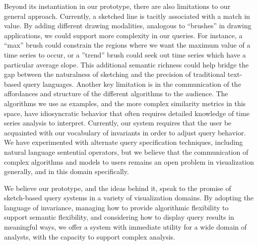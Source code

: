 Beyond its instantiation in our prototype, there are also limitations to our general approach. Currently, a sketched line is tacitly associated with a match in value. By adding different drawing modalities, analogous to ``brushes'' in drawing applications, we could support more complexity in our queries. For instance, a ``max'' brush could constrain the regions where we want the maximum value of a time series to occur, or a ''trend'' brush could seek out time series which have a particular average slope. This additional semantic richness could help bridge the gap between the naturalness of sketching and the precision of traditional text-based query languages. Another key limitation is in the communication of the affordances and structure of the different algorithms to the audience. The algorithms we use as examples, and the more complex similarity metrics in this space, have idiosyncratic behavior that often requires detailed knowledge of time series analysis to interpret. Currently, our system requires that the user be acquainted with our vocabulary of invariants in order to adjust query behavior. We have experimented with alternate query specification techniques, including natural language sentential operators, but we believe that the communication of complex algorithms and models to users remains an open problem in visualization generally, and in this domain specifically.

We believe our prototype, and the ideas behind it, speak to the promise of sketch-based query systems in a variety of visualization domains. By adopting the language of invariance, managing how to provide algorithmic flexibility to support semantic flexibility, and considering how to display query results in meaningful ways, we offer a system with immediate utility for a wide domain of analysts, with the capacity to support complex analysis.